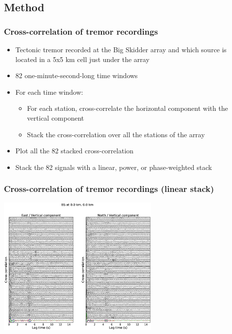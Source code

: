 \documentclass{beamer}
\begin{document}

	\subsection{Method}

	\begin{frame}
		\frametitle{Cross-correlation of tremor recordings}
		\begin{itemize}
			\item Tectonic tremor recorded at the Big Skidder array and which source is located in a 5x5 km cell just under the array
			\item 82 one-minute-second-long time windows
			\item For each time window:
			\begin{itemize}
				\item For each station, cross-correlate the horizontal component with the vertical component
				\item Stack the cross-correlation over all the stations of the array
			\end{itemize}
			\item Plot all the 82 stacked cross-correlation
			\item Stack the 82 signals with a linear, power, or phase-weighted stack
		\end{itemize}
	\end{frame}

	\begin{frame}
		\frametitle{Cross-correlation of tremor recordings (linear stack)}
		\begin{center}
			\includegraphics[width=8cm, trim={5cm 2cm 5cm 3.5cm}, clip]{BS/BS_000_000_lin.eps}
		\end{center}
	\end{frame}
\end{document}
